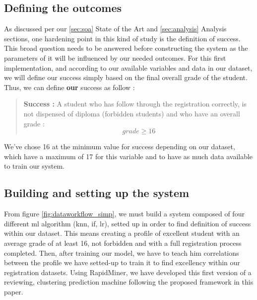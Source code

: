 \documentclass[../main.tex]{subfiles}
\begin{document}
\subsection{Defining the outcomes}

As discussed per our \ref{sec:soa} State of the Art and \ref{sec:analysis} Analysis sections, one hardening point in this kind of study is the definition of success. This broad question needs to be answered before constructing the system as the parameters of it will be influenced by our needed outcomes.
For this first implementation, and according to our available variables and data in our dataset, we will define our success simply based on the final overall grade of the student. Thus, we can define \textbf{our} success as follow :
\begin{quote}
    \textbf{Success :} A student who has follow through the registration correctly, is not dispensed of diploma (forbidden students) and who have an overall grade :
    \begin{equation}
        grade \geq 16
    \end{equation}
\end{quote}

We've chose 16 at the minimum value for success depending on our dataset, which have a maximum of 17 for this variable and to have as much data available to train our system.

\subsection{Building and setting up the system}

From figure \ref{fig:dataworkflow_simp}, we must build a system composed of four different \acrshort{ml} algorithm (\acrfull{knn}, \acrfull{if}, \acrfull{lr}), setted up in order to find definition of success within our dataset. This means creating a profile of excellent student with an average grade of at least 16, not forbidden and with a full registration process completed. 
Then, after training our model, we have to teach him correlations between the profile we have setted-up to train it to find excellency within our registration datasets.
Using RapidMiner, we have developed this first version of a reviewing, clustering prediction machine following the proposed framework in this paper.
\end{document}
